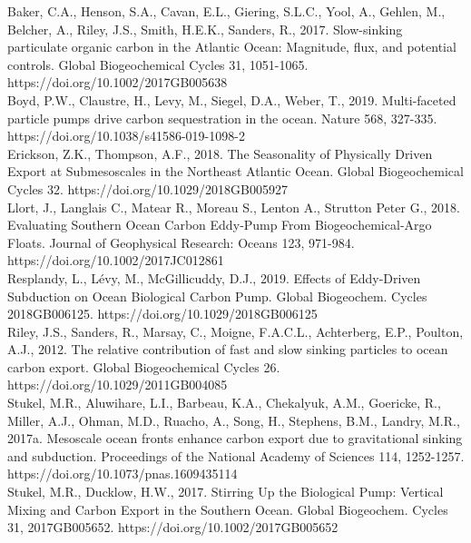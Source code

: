 \documentclass[12pt,letter]{article}
\begin{document}
Baker, C.A., Henson, S.A., Cavan, E.L., Giering, S.L.C., Yool, A., Gehlen, M., Belcher, A., Riley, J.S., Smith, H.E.K., Sanders, R., 2017. Slow-sinking particulate organic carbon in the Atlantic Ocean: Magnitude, flux, and potential controls. Global Biogeochemical Cycles 31, 1051-1065. https://doi.org/10.1002/2017GB005638\\

Boyd, P.W., Claustre, H., Levy, M., Siegel, D.A., Weber, T., 2019. Multi-faceted particle pumps drive carbon sequestration in the ocean. Nature 568, 327-335. https://doi.org/10.1038/s41586-019-1098-2\\

Erickson, Z.K., Thompson, A.F., 2018. The Seasonality of Physically Driven Export at Submesoscales in the Northeast Atlantic Ocean. Global Biogeochemical Cycles 32. https://doi.org/10.1029/2018GB005927\\

Llort, J., Langlais C., Matear R., Moreau S., Lenton A., Strutton Peter G., 2018. Evaluating Southern Ocean Carbon Eddy‐Pump From Biogeochemical‐Argo Floats. Journal of Geophysical Research: Oceans 123, 971-984. https://doi.org/10.1002/2017JC012861\\

Resplandy, L., Lévy, M., McGillicuddy, D.J., 2019. Effects of Eddy‐Driven Subduction on Ocean Biological Carbon Pump. Global Biogeochem. Cycles 2018GB006125. https://doi.org/10.1029/2018GB006125\\

Riley, J.S., Sanders, R., Marsay, C., Moigne, F.A.C.L., Achterberg, E.P., Poulton, A.J., 2012. The relative contribution of fast and slow sinking particles to ocean carbon export. Global Biogeochemical Cycles 26. https://doi.org/10.1029/2011GB004085\\

Stukel, M.R., Aluwihare, L.I., Barbeau, K.A., Chekalyuk, A.M., Goericke, R., Miller, A.J., Ohman, M.D., Ruacho, A., Song, H., Stephens, B.M., Landry, M.R., 2017a. Mesoscale ocean fronts enhance carbon export due to gravitational sinking and subduction. Proceedings of the National Academy of Sciences 114, 1252-1257. https://doi.org/10.1073/pnas.1609435114\\

Stukel, M.R., Ducklow, H.W., 2017. Stirring Up the Biological Pump: Vertical Mixing and Carbon Export in the Southern Ocean. Global Biogeochem. Cycles 31, 2017GB005652. https://doi.org/10.1002/2017GB005652\\
\end{document}
